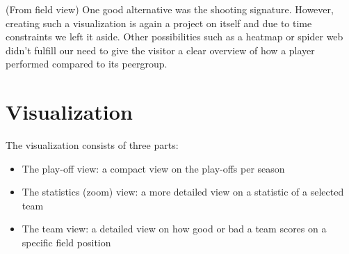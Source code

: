 \documentclass[chi_draft]{sigchi}
\begin{document}
(From field view)
One good alternative was the shooting signature.\cite{peterbeshai} However,
creating such a visualization is again a project on itself and due to time
constraints we left it aside. Other possibilities such as a heatmap or spider
web didn't fulfill our need to give the visitor a clear overview of how a player
performed compared to its peergroup.







\section{Visualization}\label{sec:visualization}
The visualization consists of three parts:
\begin{itemize}
    \item The play-off view: a compact view on the play-offs per season
    \item The statistics (zoom) view: a more detailed view on a statistic of a
        selected team
    \item The team view: a detailed view on how good or bad a team scores on a
        specific field position
\end{itemize}
\end{document}
